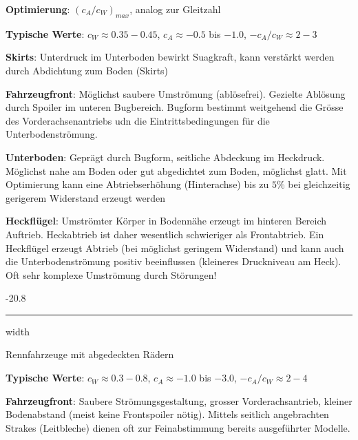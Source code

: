 \documentclass[8pt, landscape, fleqn]{scrartcl}
\makeatletter
\renewcommand{\subsubsection}{\@startsection{subsubsection}{1}{0mm}%
{-2\baselineskip}{0.8\baselineskip}%
{\hrule depth 0.2pt width\columnwidth\vspace*{1.2em}\normalsize\bfseries\rmfamily}}
\makeatother
\begin{document}
\begin{multicols*}{3}
\textbf{Optimierung}: $(c_A / c_W)_{max}$, analog zur Gleitzahl \newline \newline

\textbf{Typische Werte}: $c_W \approx 0.35 - 0.45$, $c_A \approx -0.5$ bis $-1.0$, $-c_A/c_W \approx 2-3$ \newline \newline

\textbf{Skirts}: Unterdruck im Unterboden bewirkt Suagkraft, kann verstärkt werden durch Abdichtung zum Boden (Skirts) \newline \newline

\textbf{Fahrzeugfront}: Möglichst saubere Umströmung (ablösefrei). Gezielte Ablösung durch Spoiler im unteren Bugbereich. Bugform bestimmt weitgehend die Grösse des Vorderachsenantriebs udn die Eintrittsbedingungen für die Unterbodenströmung.  \newline \newline

\textbf{Unterboden}: Geprägt durch Bugform, seitliche Abdeckung im Heckdruck. Möglichst nahe am Boden oder gut abgedichtet zum Boden, möglichst glatt. Mit Optimierung kann eine Abtriebserhöhung (Hinterachse) bis zu $5\%$ bei gleichzeitig gerigerem Widerstand erzeugt werden \newline \newline

\textbf{Heckflügel}: Umströmter Körper in Bodennähe erzeugt im hinteren Bereich Auftrieb. Heckabtrieb ist daher wesentlich schwieriger als Frontabtrieb. Ein Heckflügel
erzeugt Abtrieb (bei möglichst geringem Widerstand) und kann auch die Unterbodenströmung positiv beeinflussen (kleineres Druckniveau am Heck). Oft sehr komplexe Umströmung durch Störungen! \newline \newline

\subsubsection{Rennfahrzeuge mit abgedeckten Rädern}

\textbf{Typische Werte}: $c_W \approx 0.3 - 0.8$, $c_A \approx -1.0$ bis $-3.0$, $-c_A/c_W \approx 2 - 4$ \newline \newline

\textbf{Fahrzeugfront}: Saubere Strömungsgestaltung, grosser Vorderachsantrieb, kleiner Bodenabstand (meist keine Frontspoiler nötig). Mittels seitlich angebrachten 
Strakes (Leitbleche) dienen oft zur Feinabstimmung bereits ausgeführter Modelle. \newline \newline


\end{multicols*}
\end{document}
